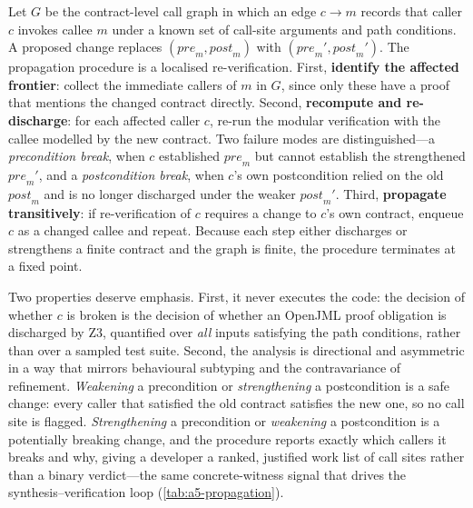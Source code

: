 Let $G$ be the contract-level call graph in which an edge $c \rightarrow m$ records that caller $c$ invokes callee $m$ under a known set of call-site arguments and path conditions. A proposed change replaces $(\mathit{pre}_m, \mathit{post}_m)$ with $(\mathit{pre}_m', \mathit{post}_m')$. The propagation procedure is a localised re-verification. First, \textbf{identify the affected frontier}: collect the immediate callers of $m$ in $G$, since only these have a proof that mentions the changed contract directly. Second, \textbf{recompute and re-discharge}: for each affected caller $c$, re-run the modular verification with the callee modelled by the new contract. Two failure modes are distinguished---a \emph{precondition break}, when $c$ established $\mathit{pre}_m$ but cannot establish the strengthened $\mathit{pre}_m'$, and a \emph{postcondition break}, when $c$'s own postcondition relied on the old $\mathit{post}_m$ and is no longer discharged under the weaker $\mathit{post}_m'$. Third, \textbf{propagate transitively}: if re-verification of $c$ requires a change to $c$'s own contract, enqueue $c$ as a changed callee and repeat. Because each step either discharges or strengthens a finite contract and the graph is finite, the procedure terminates at a fixed point.

Two properties deserve emphasis. First, it never executes the code: the decision of whether $c$ is broken is the decision of whether an OpenJML proof obligation is discharged by Z3, quantified over \emph{all} inputs satisfying the path conditions, rather than over a sampled test suite. Second, the analysis is directional and asymmetric in a way that mirrors behavioural subtyping and the contravariance of refinement. \emph{Weakening} a precondition or \emph{strengthening} a postcondition is a safe change: every caller that satisfied the old contract satisfies the new one, so no call site is flagged. \emph{Strengthening} a precondition or \emph{weakening} a postcondition is a potentially breaking change, and the procedure reports exactly which callers it breaks and why, giving a developer a ranked, justified work list of call sites rather than a binary verdict---the same concrete-witness signal that drives the synthesis--verification loop (\cref{tab:a5-propagation}).


